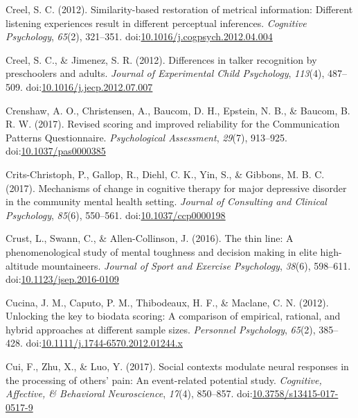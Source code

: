 \documentclass[english,man]{apa6}
\theoremstyle{definition}
\theoremstyle{definition}
\theoremstyle{definition}
\theoremstyle{remark}
\begin{document}
\hypertarget{ref-Creel2012a}{}
Creel, S. C. (2012). Similarity-based restoration of metrical
information: Different listening experiences result in different
perceptual inferences. \emph{Cognitive Psychology}, \emph{65}(2),
321--351.
doi:\href{https://doi.org/10.1016/j.cogpsych.2012.04.004}{10.1016/j.cogpsych.2012.04.004}

\hypertarget{ref-Creel2012}{}
Creel, S. C., \& Jimenez, S. R. (2012). Differences in talker
recognition by preschoolers and adults. \emph{Journal of Experimental
Child Psychology}, \emph{113}(4), 487--509.
doi:\href{https://doi.org/10.1016/j.jecp.2012.07.007}{10.1016/j.jecp.2012.07.007}

\hypertarget{ref-Crenshaw2016}{}
Crenshaw, A. O., Christensen, A., Baucom, D. H., Epstein, N. B., \&
Baucom, B. R. W. (2017). Revised scoring and improved reliability for
the Communication Patterns Questionnaire. \emph{Psychological
Assessment}, \emph{29}(7), 913--925.
doi:\href{https://doi.org/10.1037/pas0000385}{10.1037/pas0000385}

\hypertarget{ref-Crits-Christoph2017a}{}
Crits-Christoph, P., Gallop, R., Diehl, C. K., Yin, S., \& Gibbons, M.
B. C. (2017). Mechanisms of change in cognitive therapy for major
depressive disorder in the community mental health setting.
\emph{Journal of Consulting and Clinical Psychology}, \emph{85}(6),
550--561.
doi:\href{https://doi.org/10.1037/ccp0000198}{10.1037/ccp0000198}

\hypertarget{ref-Crust2016}{}
Crust, L., Swann, C., \& Allen-Collinson, J. (2016). The thin line: A
phenomenological study of mental toughness and decision making in elite
high-altitude mountaineers. \emph{Journal of Sport and Exercise
Psychology}, \emph{38}(6), 598--611.
doi:\href{https://doi.org/10.1123/jsep.2016-0109}{10.1123/jsep.2016-0109}

\hypertarget{ref-Cucina2012}{}
Cucina, J. M., Caputo, P. M., Thibodeaux, H. F., \& Maclane, C. N.
(2012). Unlocking the key to biodata scoring: A comparison of empirical,
rational, and hybrid approaches at different sample sizes.
\emph{Personnel Psychology}, \emph{65}(2), 385--428.
doi:\href{https://doi.org/10.1111/j.1744-6570.2012.01244.x}{10.1111/j.1744-6570.2012.01244.x}

\hypertarget{ref-Cui2017}{}
Cui, F., Zhu, X., \& Luo, Y. (2017). Social contexts modulate neural
responses in the processing of others' pain: An event-related potential
study. \emph{Cognitive, Affective, \& Behavioral Neuroscience},
\emph{17}(4), 850--857.
doi:\href{https://doi.org/10.3758/s13415-017-0517-9}{10.3758/s13415-017-0517-9}
\end{document}

